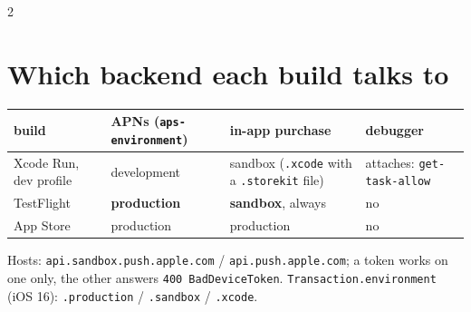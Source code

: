 \documentclass[8pt]{extarticle}
\newcommand\ct[1]{\texttt{#1}}
\begin{document}
\begin{multicols}{2}
\section{Which backend each build talks to}
{\footnotesize\setlength{\tabcolsep}{2.5pt}
\begin{tabular}{@{}>{\raggedright\arraybackslash}p{15mm}>{\raggedright\arraybackslash}p{20mm}>{\raggedright\arraybackslash}p{22mm}>{\raggedright\arraybackslash}p{17mm}@{}}
\toprule
\textbf{build} & \textbf{APNs} (\ct{aps-environment}) & \textbf{in-app purchase} & \textbf{debugger}\\ \midrule
Xcode Run, dev profile & development & sandbox (\ct{.xcode} with a \ct{.storekit} file) & attaches: \ct{get-task-allow}\\
TestFlight & \textbf{production} & \textbf{sandbox}, always & no\\
App Store & production & production & no\\
\bottomrule
\end{tabular}}

\noindent Hosts: \ct{api.sandbox.push.apple.com} / \ct{api.push.apple.com}; a token works on
one only, the other answers \ct{400 BadDeviceToken}. \ct{Transaction.environment} (iOS 16):
\ct{.production} / \ct{.sandbox} / \ct{.xcode}.


\end{multicols}
\end{document}
